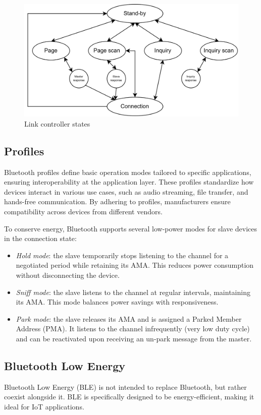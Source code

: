 \begin{figure}[H]
    \centering
    \includegraphics[width=0.5\linewidth]{images/iot20.png}
    \caption{Link controller states}
\end{figure}

\subsection{Profiles}
Bluetooth profiles define basic operation modes tailored to specific applications, ensuring interoperability at the application layer. 
These profiles standardize how devices interact in various use cases, such as audio streaming, file transfer, and hands-free communication. 
By adhering to profiles, manufacturers ensure compatibility across devices from different vendors.

To conserve energy, Bluetooth supports several low-power modes for slave devices in the connection state:
\begin{itemize}
    \item \textit{Hold mode}: the slave temporarily stops listening to the channel for a negotiated period while retaining its AMA. 
        This reduces power consumption without disconnecting the device.
    \item \textit{Sniff mode}: the slave listens to the channel at regular intervals, maintaining its AMA. 
        This mode balances power savings with responsiveness.
    \item \textit{Park mode}: the slave releases its AMA and is assigned a Parked Member Address (PMA). 
        It listens to the channel infrequently (very low duty cycle) and can be reactivated upon receiving an un-park message from the master.
\end{itemize}

\subsection{Bluetooth Low Energy}
Bluetooth Low Energy (BLE) is not intended to replace Bluetooth, but rather coexist alongside it. 
BLE is specifically designed to be energy-efficient, making it ideal for IoT applications.

